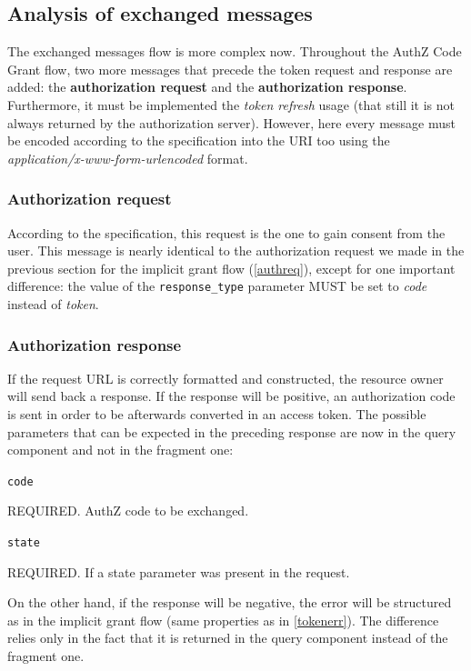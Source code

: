 \vspace{1cm}

\subsection{Analysis of exchanged messages}
The exchanged messages flow is more complex now. Throughout the AuthZ Code Grant flow, two more messages that precede the token request and response are added: the \textbf{authorization request} and the \textbf{authorization response}. Furthermore, it must be implemented the \textit{token refresh} usage (that still it is not always returned by the authorization server). However, here every message must be encoded according to the specification into the URI too using the \textit{application/x-www-form-urlencoded} format.

\subsubsection{Authorization request}
According to the specification, this request is the one to gain consent from the user. This message is nearly identical to the authorization request we made in the previous section for the implicit grant flow (\ref{authreq}), except for one important difference: the value of the \texttt{response\_type} parameter MUST be set to \textit{code} instead of \textit{token}.

\subsubsection{Authorization response}
If the request URL is correctly formatted and constructed, the resource owner will send back a response. If the response will be positive, an authorization code is sent in order to be afterwards converted in an access token.
The possible parameters that can be expected in the preceding response are now in the query component and not in the fragment one:

\texttt{code}

\hspace{0.5cm}REQUIRED. AuthZ code to be exchanged.

\texttt{state}

\hspace{0.5cm}REQUIRED. If a state parameter was present in the request.

\vspace{0.5cm}

On the other hand, if the response will be negative, the error will be structured as in the implicit grant flow (same properties as in \ref{tokenerr}). The difference relies only in the fact that it is returned in the query component instead of the fragment one.

